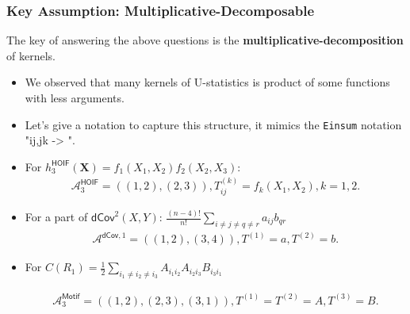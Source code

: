 \documentclass[9pt]{beamer}
\def\calA{\mathcal{A}}
\theoremstyle{mystyle}
\theoremstyle{mystyletwo}
\begin{document}
\begin{frame}
    \frametitle{Key Assumption: Multiplicative-Decomposable}
    The key of answering the above questions is the \textbf{multiplicative-decomposition} of kernels.
    \begin{itemize}
        \item We observed that many kernels of U-statistics is product of some functions with less arguments.
        \item Let's give a notation to capture this structure, it mimics the \texttt{Einsum} notation "ij,jk -> ".
        \item For $h^{\mathsf{HOIF}}_3(\bm{X}) = f_1(X_1,X_2) f_2(X_2,X_3) $:
        \begin{align*}
           \calA^{\mathsf{HOIF}}_3 = ((1,2),(2,3)), T^{(k)}_{ij} = f_k(X_1,X_2), k =1,2.
        \end{align*}

        \pause
        
        \item For a part of $\mathsf{dCov}^2(X, Y)$: $ \frac{(n-4)!}{n!} \sum_{i \neq j \neq q \neq r}
                  a_{ij}b_{qr}$
        \begin{align*}
            \calA^{\mathsf{dCov},1} = ((1,2),(3,4)), T^{(1)} = a, T^{(2)} = b.               
        \end{align*}

        \pause
        
        \item For  $C(R_1) = \frac{1}{2} \sum_{ i_1 \neq i_2 \neq i_3}  A_{i_1 i_2} A_{i_2 i_3}  B_{i_3 i_1}$

        \begin{align*}
           \calA^{\mathsf{Motif}}_3 = ((1,2),(2,3),(3,1)), T^{(1)} = T^{(2)} = A, T^{(3)} = B.            
        \end{align*}

    \end{itemize}
\end{frame}
\end{document}
